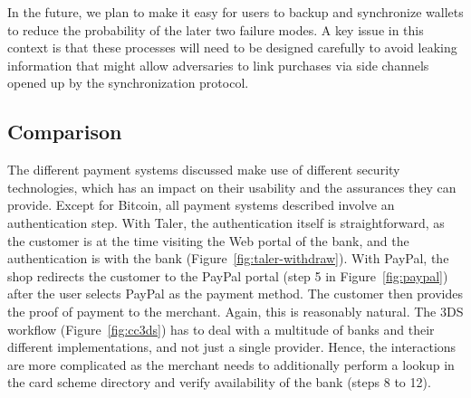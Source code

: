 \documentclass{llncs}
\begin{document}
In the future, we plan to make it easy for users to backup and
synchronize wallets to reduce the probability of the later two failure
modes.  A key issue in this context is that these processes will need
to be designed carefully to avoid leaking information that might allow
adversaries to link purchases via side channels opened up by the
synchronization protocol.

\subsection{Comparison}

The different payment systems discussed make use of different security
technologies, which has an impact on their usability and the
assurances they can provide.  Except for Bitcoin, all payment systems
described involve an authentication step.
With Taler, the authentication itself is straightforward, as the customer is
at the time visiting the Web portal of the bank, and the authentication is
with the bank (Figure~\ref{fig:taler-withdraw}).  With PayPal, the
shop redirects the customer to the PayPal portal (step 5 in
Figure~\ref{fig:paypal}) after the user selects PayPal as the payment
method. The customer then provides the proof of payment to the
merchant.  Again, this is reasonably natural.  The 3DS workflow
(Figure~\ref{fig:cc3ds}) has to deal with a multitude of banks and
their different implementations, and not just a single provider.
Hence, the interactions are more complicated as the merchant needs to
additionally perform a lookup in the card scheme directory and verify
availability of the bank (steps 8 to 12).
\end{document}
